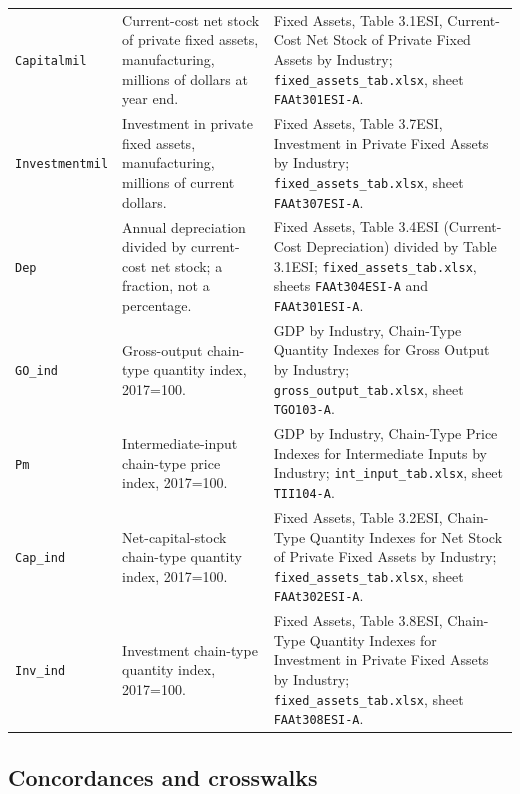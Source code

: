 \documentclass[11pt]{article}
\newcommand{\pkgfile}[1]{\nolinkurl{#1}}
\begin{document}
{\begin{longtable}{@{}>{\raggedright\arraybackslash}p{2.4cm}
                    >{\raggedright\arraybackslash}p{6.0cm}
                    >{\raggedright\arraybackslash}p{6.5cm}@{}}
\texttt{Capitalmil}
& Current-cost net stock of private fixed assets, manufacturing, millions of dollars at year end.
& Fixed Assets, Table 3.1ESI, Current-Cost Net Stock of Private Fixed Assets by Industry; \pkgfile{fixed_assets_tab.xlsx}, sheet \pkgfile{FAAt301ESI-A}.
\\[7pt]

\texttt{Investmentmil}
& Investment in private fixed assets, manufacturing, millions of current dollars.
& Fixed Assets, Table 3.7ESI, Investment in Private Fixed Assets by Industry; \pkgfile{fixed_assets_tab.xlsx}, sheet \pkgfile{FAAt307ESI-A}.
\\[7pt]

\texttt{Dep}
& Annual depreciation divided by current-cost net stock; a fraction, not a percentage.
& Fixed Assets, Table 3.4ESI (Current-Cost Depreciation) divided by Table 3.1ESI; \pkgfile{fixed_assets_tab.xlsx}, sheets \pkgfile{FAAt304ESI-A} and \pkgfile{FAAt301ESI-A}.
\\[7pt]

\texttt{GO\_ind}
& Gross-output chain-type quantity index, 2017=100.
& GDP by Industry, Chain-Type Quantity Indexes for Gross Output by Industry; \pkgfile{gross_output_tab.xlsx}, sheet \pkgfile{TGO103-A}.
\\[7pt]

\texttt{Pm}
& Intermediate-input chain-type price index, 2017=100.
& GDP by Industry, Chain-Type Price Indexes for Intermediate Inputs by Industry; \pkgfile{int_input_tab.xlsx}, sheet \pkgfile{TII104-A}.
\\[7pt]

\texttt{Cap\_ind}
& Net-capital-stock chain-type quantity index, 2017=100.
& Fixed Assets, Table 3.2ESI, Chain-Type Quantity Indexes for Net Stock of Private Fixed Assets by Industry; \pkgfile{fixed_assets_tab.xlsx}, sheet \pkgfile{FAAt302ESI-A}.
\\[7pt]

\texttt{Inv\_ind}
& Investment chain-type quantity index, 2017=100.
& Fixed Assets, Table 3.8ESI, Chain-Type Quantity Indexes for Investment in Private Fixed Assets by Industry; \pkgfile{fixed_assets_tab.xlsx}, sheet \pkgfile{FAAt308ESI-A}.
\\

\end{longtable}
}

\subsection*{Concordances and crosswalks}
\end{document}
